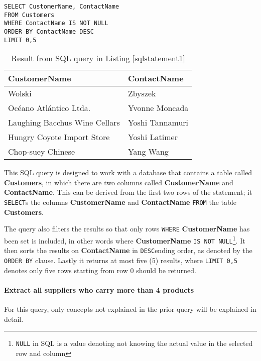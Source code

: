 \begin{lstlisting}[caption={Query for retreiving the name of five customers and their contact person},label={sqlstatement1}]
SELECT CustomerName, ContactName
FROM Customers
WHERE ContactName IS NOT NULL
ORDER BY ContactName DESC
LIMIT 0,5
\end{lstlisting}

\begin{table}[h]
  \centering
  \begin{tabular}{ | l | l | }
    \hline
    \textbf{CustomerName} & \textbf{ContactName} \\
    \hline
    Wolski & Zbyszek  \\
    \hline
    Océano Atlántico Ltda. & Yvonne Moncada \\
    \hline
    Laughing Bacchus Wine Cellars & Yoshi Tannamuri \\
    \hline
    Hungry Coyote Import Store & Yoshi Latimer \\
    \hline
    Chop-suey Chinese & Yang Wang \\
    \hline
  \end{tabular}
  \caption{Result from SQL query in Listing \ref{sqlstatement1}}
  \label{table:sql1}
\end{table}


This SQL query is designed to work with a database that contains a table
called \textbf{Customers}, in which there are two columns called
\textbf{CustomerName} and \textbf{ContactName}. This can be derived
from the first two rows of the statement; it \texttt{SELECT}s the
columns \textbf{CustomerName} and \textbf{ContactName} \texttt{FROM}
the table \textbf{Customers}.

The query also filters the results so that only rows \texttt{WHERE}
\textbf{CustomerName} has been set is included, in other words where
\textbf{CustomerName} \texttt{IS NOT NULL}\footnote{\texttt{NULL} in SQL is a
  value denoting not knowing the actual value in the selected row and column}.
It then sorts the results on \textbf{ContactName} in \texttt{DESC}ending order,
as denoted by the \texttt{ORDER BY} clause. Lastly it returns at most five (5)
results, where \texttt{LIMIT 0,5} denotes only five rows starting from row 0
should be returned.


\paragraph{Extract all suppliers who carry more than 4 products}
For this query, only concepts not explained in the prior query will be
explained in detail.

